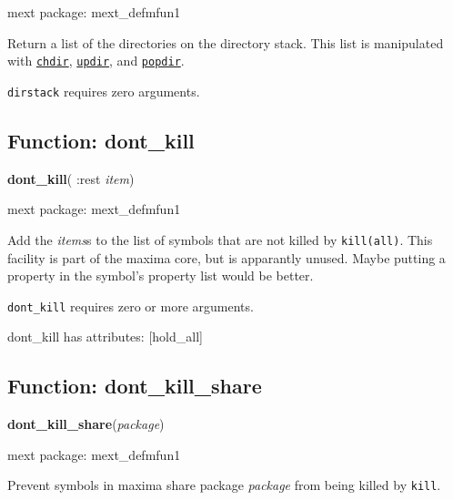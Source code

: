 \documentclass[]{article}
\begin{document}
\noindent mext package: mext\_defmfun1



\vspace{5 pt}
Return a list of the directories on the directory stack. This list is manipulated with \hyperlink{chdir}{{\tt chdir}}, \hyperlink{updir}{{\tt updir}}, and \hyperlink{popdir}{{\tt popdir}}. 

\vspace{5 pt}

   {\tt dirstack} requires zero arguments.


\vspace{5 pt}


\subsection{Function: dont\_kill\label{sec:dont_kill}}
\hypertarget{dont_kill}{}
{\bf dont\_kill}( :rest {\it item})


\noindent mext package: mext\_defmfun1



\vspace{5 pt}
Add the {\it items}s to the list of symbols that are not killed by \verb#kill(all)#. This facility is part of the maxima core, but is apparantly unused. Maybe putting a property in the symbol's property list would be better. 

\vspace{5 pt}

   {\tt dont\_kill} requires zero or more arguments.


\vspace{5 pt}

dont\_kill has attributes: [hold\_all]

\vspace{5 pt}


\subsection{Function: dont\_kill\_share\label{sec:dont_kill_share}}
\hypertarget{dont_kill_share}{}
{\bf dont\_kill\_share}({\it package})


\noindent mext package: mext\_defmfun1



\vspace{5 pt}
Prevent symbols in maxima share package {\it package} from being killed by {\tt kill}. 
\end{document}

